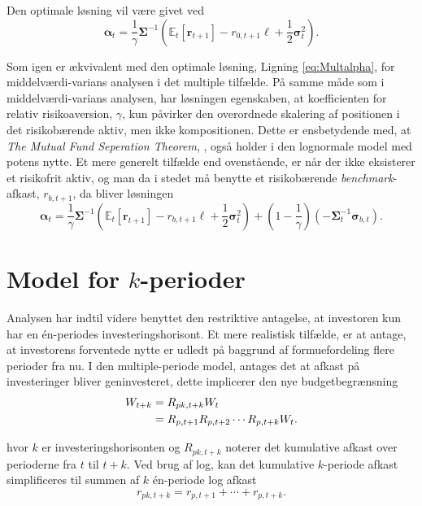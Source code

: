 \documentclass[
  a4paper,
  oneside]{memoir}
\begin{document}
Den optimale løsning vil være givet ved
\begin{equation}
\bm{\alpha}_t=\frac{1}{\gamma}\bm{\Sigma}^{-1}\left(\mathbb{E}_t[\bm{r}_{t+1}]-r_{0,t+1}\bm{\ell}+\frac{1}{2}\bm{\sigma}_t^2\right).\label{eq:Potmultalpha}
\end{equation}

Som igen er ækvivalent med den optimale løsning, Ligning \eqref{eq:Multalpha}, for middelværdi-varians analysen i det multiple tilfælde. På samme måde som i middelværdi-varians analysen, har løsningen egenskaben, at koefficienten for relativ risikoaversion, \(\gamma\), kun påvirker den overordnede skalering af positionen i det risikobærende aktiv, men ikke kompositionen. Dette er ensbetydende med, at \textit{The Mutual Fund Seperation Theorem}, \citep{Tobin1958}, også holder i den lognormale model med potens nytte. Et mere generelt tilfælde end ovenstående, er når der ikke eksisterer et risikofrit aktiv, og man da i stedet må benytte et risikobærende \emph{benchmark}-afkast, \(r_{b,t+1}\), da bliver løsningen
\begin{equation}
\bm{\alpha}_t=\frac{1}{\gamma}\bm{\Sigma}^{-1}\left(\mathbb{E}_t[\bm{r}_{t+1}]-r_{b,t+1}\bm{\ell}+\frac{1}{2}\bm{\sigma}_t^2\right)+\left(1-\frac{1}{\gamma}\right)\left(-\bm{\Sigma}_t^{-1}\bm{\sigma}_{b,t}\right).
\end{equation}

\hypertarget{modkper}{%
\section{\texorpdfstring{Model for \(k\)-perioder}{Model for k-perioder}}\label{modkper}}

Analysen har indtil videre benyttet den restriktive antagelse, at investoren kun har en én-periodes investeringshorisont. Et mere realistisk tilfælde, er at antage, at investorens forventede nytte er udledt på baggrund af formuefordeling flere perioder fra nu. I den multiple-periode model, antages det at afkast på investeringer bliver geninvesteret, dette implicerer den nye budgetbegrænsning
\begin{align}
W_{t+k}&=R_{pk,t+k}W_t \notag\\
&=R_{p,t+1}R_{p,t+2}\cdots R_{p,t+k}W_t.
\end{align}

hvor \(k\) er investeringshorisonten og \(R_{pk,t+k}\) noterer det kumulative afkast over perioderne fra \(t\) til \(t+k\). Ved brug af log, kan det kumulative \(k\)-periode afkast simplificeres til summen af \(k\) én-periode log afkast
\begin{equation}
r_{pk,t+k}=r_{p,t+1}+\cdots+r_{p,t+k}. \label{eq:sumportk}
\end{equation}
\end{document}
